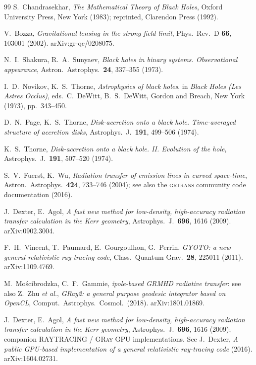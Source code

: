 \begin{thebibliography}{99}
S.~Chandrasekhar,
\emph{The Mathematical Theory of Black Holes},
Oxford University Press, New York (1983); reprinted, Clarendon Press (1992).

V.~Bozza,
\emph{Gravitational lensing in the strong field limit},
Phys.\ Rev.\ D \textbf{66}, 103001 (2002). arXiv:gr-qc/0208075.

N.~I.~Shakura, R.~A.~Sunyaev,
\emph{Black holes in binary systems. Observational appearance},
Astron.\ Astrophys.\ \textbf{24}, 337--355 (1973).

I.~D.~Novikov, K.~S.~Thorne,
\emph{Astrophysics of black holes}, in
\emph{Black Holes (Les Astres Occlus)}, eds.\ C.~DeWitt, B.~S.~DeWitt,
Gordon and Breach, New York (1973), pp.~343--450.

D.~N.~Page, K.~S.~Thorne,
\emph{Disk-accretion onto a black hole. Time-averaged structure of accretion
disks}, Astrophys.\ J.\ \textbf{191}, 499--506 (1974).

K.~S.~Thorne,
\emph{Disk-accretion onto a black hole. II. Evolution of the hole},
Astrophys.\ J.\ \textbf{191}, 507--520 (1974).

S.~V.~Fuerst, K.~Wu,
\emph{Radiation transfer of emission lines in curved space-time},
Astron.\ Astrophys.\ \textbf{424}, 733--746 (2004);
see also the \textsc{grtrans} community code documentation (2016).

J.~Dexter, E.~Agol,
\emph{A fast new method for low-density, high-accuracy radiation transfer
calculation in the Kerr geometry}, Astrophys.\ J.\ \textbf{696}, 1616 (2009).
arXiv:0902.3004.

F.~H.~Vincent, T.~Paumard, E.~Gourgoulhon, G.~Perrin,
\emph{GYOTO: a new general relativistic ray-tracing code},
Class.\ Quantum Grav.\ \textbf{28}, 225011 (2011). arXiv:1109.4769.

M.~Mo\'scibrodzka, C.~F.~Gammie,
\emph{ipole-based GRMHD radiative transfer}: see also Z.~Zhu \emph{et al.},
\emph{GRay2: a general purpose geodesic integrator based on OpenCL},
Comput.\ Astrophys.\ Cosmol.\ (2018). arXiv:1801.01869.

J.~Dexter, E.~Agol,
\emph{A fast new method for low-density, high-accuracy radiation transfer
calculation in the Kerr geometry}, Astrophys.\ J.\ \textbf{696}, 1616 (2009);
companion \textsc{RAYTRACING} / \textsc{GRay} GPU implementations.
See J.~Dexter, \emph{A public GPU-based implementation of a general relativistic
ray-tracing code} (2016). arXiv:1604.02731.


\end{thebibliography}
